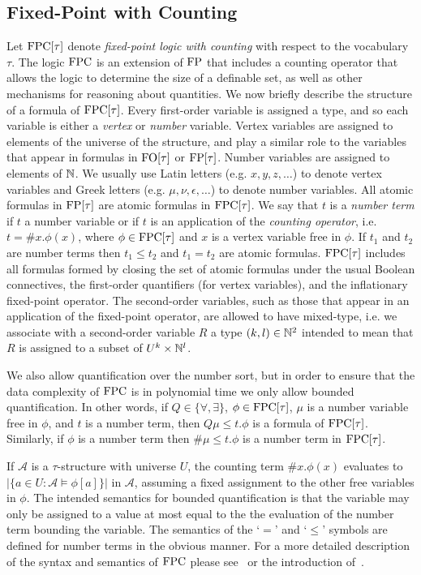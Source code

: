 \documentclass[../paper.tex]{subfiles}
\begin{document}
\subsection{Fixed-Point with Counting}
Let $\text{\upshape FPC}[\tau]$ denote \emph{fixed-point logic with counting} with respect to
the vocabulary $\tau$. The logic $\text{\upshape FPC}$ is an extension of $\text{\upshape FP}$ that includes a
counting operator that allows the logic to determine the size of a definable
set, as well as other mechanisms for reasoning about quantities. We now briefly
describe the structure of a formula of $\text{\upshape FPC}[\tau]$. Every first-order variable
is assigned a type, and so each variable is either a \emph{vertex} or
\emph{number} variable. Vertex variables are assigned to elements of the
universe of the structure, and play a similar role to the variables that appear
in formulas in $\text{\upshape FO}[\tau]$ or $\text{\upshape FP}[\tau]$. Number variables are assigned to
elements of $\mathbb{N}$. We usually use Latin letters (e.g. $x, y, z, \ldots$) to
denote vertex variables and Greek letters (e.g. $\mu, \nu, \epsilon, \ldots$) to
denote number variables. All atomic formulas in $\text{\upshape FP}[\tau]$ are atomic formulas
in $\text{\upshape FPC}[\tau]$. We say that $t$ is a \emph{number term} if $t$ a number
variable or if $t$ is an application of the \emph{counting operator}, i.e. $t =
\#x. \phi(x)$, where $\phi \in \text{\upshape FPC}[\tau]$ and $x$ is a vertex variable free in
$\phi$. If $t_1$ and $t_2$ are number terms then $t_1 \leq t_2$ and $t_1 = t_2$
are atomic formulas. $\text{\upshape FPC}[\tau]$ includes all formulas formed by closing the
set of atomic formulas under the usual Boolean connectives, the first-order
quantifiers (for vertex variables), and the inflationary fixed-point operator.
The second-order variables, such as those that appear in an application of the
fixed-point operator, are allowed to have mixed-type, i.e. we associate with a
second-order variable $R$ a type $(k, l) \in \mathbb{N}^2$ intended to mean that $R$
is assigned to a subset of $U^k \times \mathbb{N}^l$.

We also allow quantification over the number sort, but in order to ensure that
the data complexity of $\text{\upshape FPC}$ is in polynomial time we only allow bounded
quantification. In other words, if $Q \in \{\forall, \exists \}$, $\phi \in
\text{\upshape FPC}[\tau]$, $\mu$ is a number variable free in $\phi$, and $t$ is a number
term, then $Q \mu \leq t . \phi$ is a formula of $\text{\upshape FPC}[\tau]$. Similarly, if
$\phi$ is a number term then $\# \mu \leq t .\phi$ is a number term in
$\text{\upshape FPC}[\tau]$.

If $\mathcal{A}$ is a $\tau$-structure with universe $U$, the counting term
$\#x. \phi(x)$ evaluates to $\vert \{a \in U : \mathcal{A} \models \phi[a]\}
\vert$ in $\mathcal{A}$, assuming a fixed assignment to the other free variables
in $\phi$. The intended semantics for bounded quantification is that the
variable may only be assigned to a value at most equal to the the evaluation of
the number term bounding the variable. The semantics of the `$=$' and `$\leq$'
symbols are defined for number terms in the obvious manner. For a more detailed
description of the syntax and semantics of $\text{\upshape FPC}$ please
see~\cite{grohe2017descriptive} or the introduction of~\cite{GradelP15a}.
\end{document}
